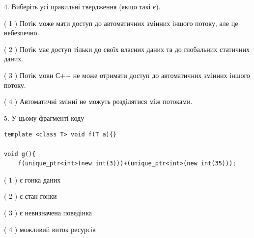 \documentclass[12pt, ukrainian]{article}
\begin{document}
\begin {large}
{%
4. Виберіть усі правильні твердження (якщо такі є).\par
\vspace{2mm}

( 1 ) Потік може мати доступ до автоматичних змінних іншого потоку, але це небезпечно.%

( 2 ) Потік має доступ тільки до своїх власних даних та до глобальних статичних даних.%

( 3 ) Потік мови С++ не може отримати доступ до автоматичних змінних іншого потоку.%

( 4 ) Автоматичні змінні не можуть розділятися між потоками.%


5. У цьому фрагменті коду
\begin{verbatim}
template <class T> void f(T a){}

void g(){
    f(unique_ptr<int>(new int(3)))+(unique_ptr<int>(new int(35)));
\end{verbatim}

( 1 ) є гонка даних%

( 2 ) є стан гонки%

( 3 ) є невизначена поведінка%

( 4 ) можливий виток ресурсів%
}
\end {large}
\end{document}
